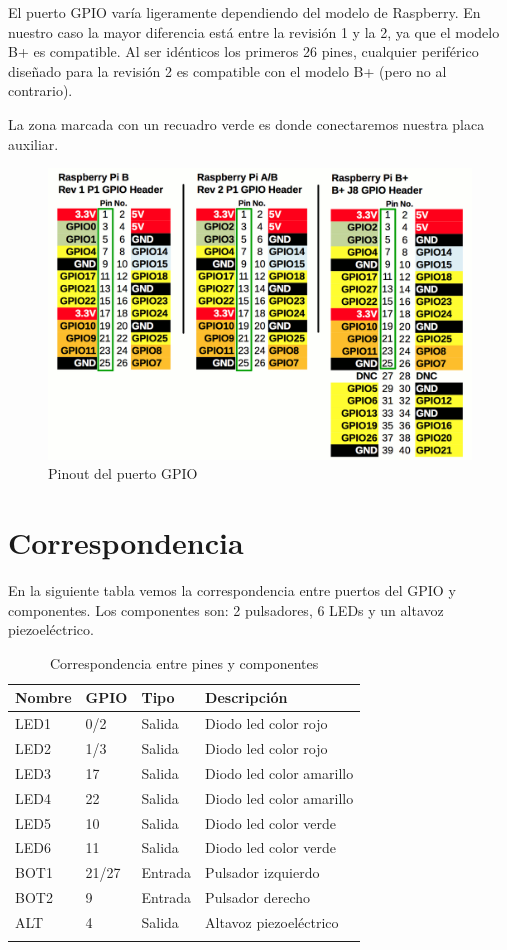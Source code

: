 El puerto GPIO varía ligeramente dependiendo del modelo de Raspberry. En nuestro caso
la mayor diferencia está entre la revisión 1 y la 2, ya que el modelo B+ es compatible.
Al ser idénticos los primeros 26 pines, cualquier periférico diseñado para la revisión 2
es compatible con el modelo B+ (pero no al contrario).

La zona marcada con un recuadro verde es donde conectaremos nuestra placa auxiliar.

\begin{figure}[h]
  \centering
    \includegraphics[width=14cm]{graphs/RaspberryGPIO.png}
  \caption{Pinout del puerto GPIO}
  \label{fig:pinout}
\end{figure}

\section{Correspondencia}

En la siguiente tabla vemos la correspondencia entre puertos del GPIO y
componentes. Los componentes son: 2 pulsadores, 6 LEDs y un altavoz
piezoeléctrico.

\begin{longtable}{ p{1.8cm} | p{1.2cm} | p{2cm} | p{5cm}}
\hline
{\bf Nombre} & {\bf GPIO} & {\bf Tipo} & {\bf Descripción} \\ \hline
LED1 & 0/2 & Salida & Diodo led color rojo \\ \hline
LED2 & 1/3 & Salida & Diodo led color rojo \\ \hline
LED3 & 17 & Salida & Diodo led color amarillo \\ \hline
LED4 & 22 & Salida & Diodo led color amarillo \\ \hline
LED5 & 10 & Salida & Diodo led color verde \\ \hline
LED6 & 11 & Salida & Diodo led color verde \\ \hline
BOT1 & 21/27 & Entrada & Pulsador izquierdo \\ \hline
BOT2 & 9 & Entrada & Pulsador derecho \\ \hline
ALT & 4 & Salida & Altavoz piezoeléctrico \\ \hline
\caption{Correspondencia entre pines y componentes}
\label{tab:berry}
\end{longtable}

